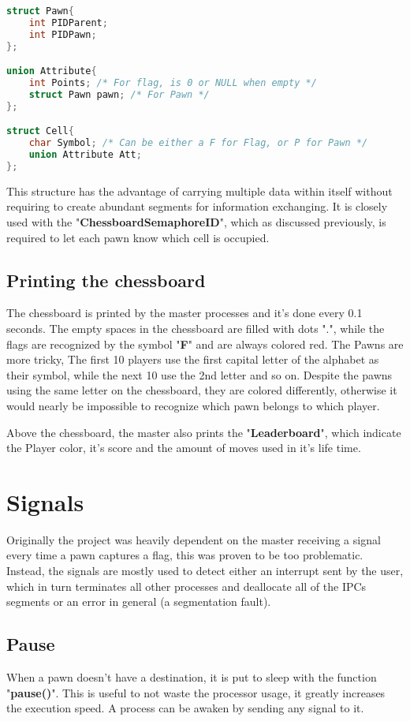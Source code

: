 \documentclass[11pt]{article}
\begin{document}
	\begin{lstlisting}[language=C]
struct Pawn{
	int PIDParent;
	int PIDPawn;
};

union Attribute{
	int Points; /* For flag, is 0 or NULL when empty */
	struct Pawn pawn; /* For Pawn */
};

struct Cell{
	char Symbol; /* Can be either a F for Flag, or P for Pawn */
	union Attribute Att;
};
    \end{lstlisting}
    
    This structure has the advantage of carrying multiple data within itself without requiring to create abundant segments for information exchanging. It is closely used with the "\textbf{ChessboardSemaphoreID}", which as discussed previously, is required to let each pawn know which cell is occupied.
    
    \subsection{Printing the chessboard}
    
	The chessboard is printed by the master processes and it's done every 0.1 seconds. The empty spaces in the chessboard are filled with dots ".", while the flags are recognized by the symbol "\textbf{F}" and are always colored red. The Pawns are more tricky, The first 10 players use the first capital letter of the alphabet as their symbol, while the next 10 use the 2nd letter and so on. Despite the pawns using the same letter on the chessboard, they are colored differently, otherwise it would nearly be impossible to recognize which pawn belongs to which player.
	
	Above the chessboard, the master also prints the "\textbf{Leaderboard}", which indicate the Player color, it's score and the amount of moves used in it's life time.
	
	\section{Signals}
	
	Originally the project was heavily dependent on the master receiving a signal every time a pawn captures a flag, this was proven to be too problematic. Instead, the signals are mostly used to detect either an interrupt sent by the user, which in turn terminates all other processes and deallocate all of the IPCs segments or an error in general (a segmentation fault).
	
	\subsection{Pause}
	When a pawn doesn't have a destination, it is put to sleep with the function "\textbf{pause()}". This is useful to not waste the processor usage, it greatly increases the execution speed. A process can be awaken by sending any signal to it.
	
\end{document}
